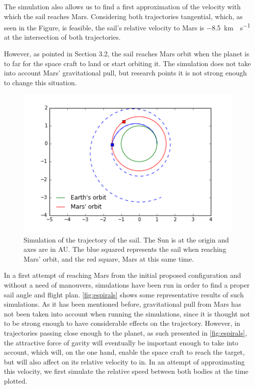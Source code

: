 \documentclass[twocolumn,12pt,a4paper]{article}
\numberwithin{equation}{section}
\begin{document}
The simulation also allows us to find a first approximation of the velocity with which the sail reaches Mars. Considering both trajectories tangential, which, as seen in the Figure, is feasible, the sail's relative velocity to Mars is \SI{-8,5}{km\cdot s^{-1}} at the intersection of both trajectories.

However, as pointed in Section 3.2, the sail reaches Mars orbit when the planet is to far for the space craft to land or start orbiting it. The simulation does not take into account Mars' gravitational pull, but research points it is not strong enough to change this situation.


\begin{figure}[h]
	\centering
	\includegraphics[scale=0.5]{simu.png}
	\caption{\small Simulation of the trajectory of the sail. The Sun is at the origin and axes are in AU. The blue squared represents the sail when reaching Mars' orbit, and the red square, Mars at this same time.}
	\label{fig:simu}
\end{figure}

In a first attempt of reaching Mars from the initial proposed configuration and without a need of manouvers, simulations have been run in order to find a proper sail angle and flight plan. \autoref{fig:espirals} shows some representative results of such simulations. As it has been mentioned before, gravitational pull from Mars has not been taken into account when running the simulations, since it is thought not to be strong enough to have considerable effects on the trajectory. However, in trajectories passing close enough to the planet, as such presented in \autoref{fig:espirals}, the attractive force of gavity will eventually be important enough to take into account, which will, on the one hand, enable the space craft to reach the target, but will also affect on its relative velocity to in. In an attempt of approximating this velocity, we first simulate the relative speed between both bodies at the time plotted.
\end{document}
